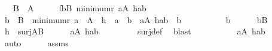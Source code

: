 \begin{isabellebody}
\ \ \ {\isachardoublequoteopen}B\ {\isasymlesssim}\ A{\isachardoublequoteclose}\isanewline
%
\isadelimproof
%
\endisadelimproof
%
\isatagproof
{}\isamarkupfalse%
\ {\isacharminus}{\kern0pt}\isanewline
\ \ \isamarkupfalse%
\ {\isacharquery}{\kern0pt}f{\isacharequal}{\kern0pt}{\isachardoublequoteopen}{\isasymlambda}b{\isasymin}B{\isachardot}{\kern0pt}\ minimum{\isacharparenleft}{\kern0pt}r{\isacharcomma}{\kern0pt}\ {\isacharbraceleft}{\kern0pt}a{\isasymin}A{\isachardot}{\kern0pt}\ h{\isacharbackquote}{\kern0pt}a{\isacharequal}{\kern0pt}b{\isacharbraceright}{\kern0pt}{\isacharparenright}{\kern0pt}{\isachardoublequoteclose}\isanewline
\ \ \isamarkupfalse%
\ {\isachardoublequoteopen}b\ {\isasymin}\ B\ {\isasymLongrightarrow}\ minimum{\isacharparenleft}{\kern0pt}r{\isacharcomma}{\kern0pt}\ {\isacharbraceleft}{\kern0pt}a\ {\isasymin}\ A\ {\isachardot}{\kern0pt}\ h\ {\isacharbackquote}{\kern0pt}\ a\ {\isacharequal}{\kern0pt}\ b{\isacharbraceright}{\kern0pt}{\isacharparenright}{\kern0pt}\ {\isasymin}\ {\isacharbraceleft}{\kern0pt}a{\isasymin}A{\isachardot}{\kern0pt}\ h{\isacharbackquote}{\kern0pt}a{\isacharequal}{\kern0pt}b{\isacharbraceright}{\kern0pt}{\isachardoublequoteclose}\ \ b\isanewline
\ \ \isamarkupfalse%
\ {\isacharminus}{\kern0pt}\isanewline
\ \ \ \ \isamarkupfalse%
\ b\isanewline
\ \ \ \ \isamarkupfalse%
\ {\isachardoublequoteopen}b{\isasymin}B{\isachardoublequoteclose}\isanewline
\ \ \ \ \isamarkupfalse%
\ {\isacartoucheopen}h\ {\isasymin}\ surj{\isacharparenleft}{\kern0pt}A{\isacharcomma}{\kern0pt}B{\isacharparenright}{\kern0pt}{\isacartoucheclose}\isanewline
\ \ \ \ \isamarkupfalse%
\ {\isachardoublequoteopen}{\isasymexists}a{\isasymin}A{\isachardot}{\kern0pt}\ h{\isacharbackquote}{\kern0pt}a{\isacharequal}{\kern0pt}b{\isachardoublequoteclose}\ \isanewline
\ \ \ \ \ \ \isamarkupfalse%
\ surj{\isacharunderscore}{\kern0pt}def\ \isamarkupfalse%
\ blast\isanewline
\ \ \ \ \isamarkupfalse%
\isanewline
\ \ \ \ \isamarkupfalse%
\ {\isachardoublequoteopen}{\isacharbraceleft}{\kern0pt}a{\isasymin}A{\isachardot}{\kern0pt}\ h{\isacharbackquote}{\kern0pt}a{\isacharequal}{\kern0pt}b{\isacharbraceright}{\kern0pt}\ {\isasymnoteq}\ {}{\isachardoublequoteclose}\isanewline
\ \ \ \ \ \ \isamarkupfalse%
\ auto\isanewline
\ \ \ \ \isamarkupfalse%
\ assms\isanewline
\ \ \ \ \isamarkupfalse%

\end{isabellebody}

